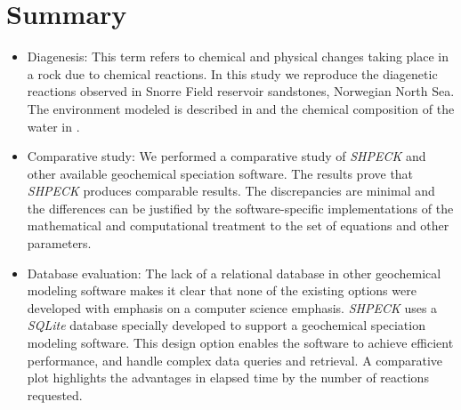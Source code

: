 \newpage

\section{Summary}
\begin{itemize}
    \item Diagenesis: This term refers to chemical and physical changes taking place in a rock due to chemical reactions. In this study we reproduce the diagenetic reactions observed in Snorre Field reservoir sandstones, Norwegian North Sea. 
    The environment modeled is described in \cite{Morad:90} and the chemical composition of the water in \cite{Nordstrom:79}.
    \item Comparative study: We performed a comparative study of \emph{SHPECK} and other available geochemical speciation software. The results prove that \emph{SHPECK} produces comparable results. The discrepancies are minimal and the differences can be justified by the software-specific implementations of the mathematical and computational treatment to the set of equations and other parameters. 
    \item Database evaluation: The lack of a relational database in other geochemical modeling software makes it clear that none of the existing options were developed with emphasis on a computer science emphasis. \emph{SHPECK} uses a \emph{SQLite} database specially developed to support a geochemical speciation modeling software. This design option enables the software to achieve efficient performance, and handle complex data queries and retrieval. A comparative plot highlights the advantages in elapsed time by the number of reactions requested.
\end{itemize}